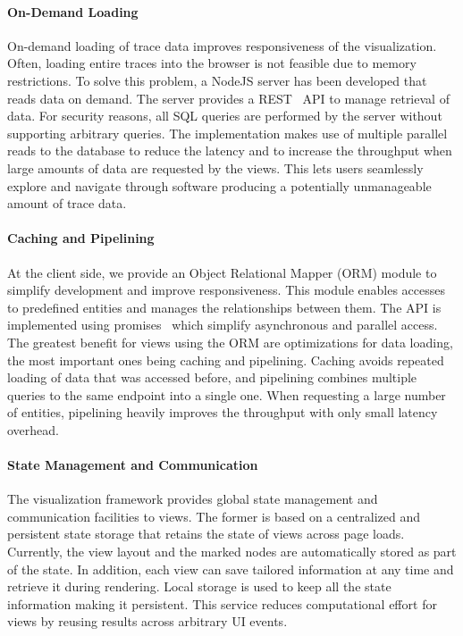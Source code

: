 \paragraph{On-Demand Loading}
On-demand loading of trace data improves responsiveness of the visualization.
Often, loading entire traces into the browser is not feasible due to memory
restrictions. To solve this problem, a NodeJS server has been developed that
reads data on demand. The server provides a REST~\cite{rest} API to manage
retrieval of data. For security reasons, all SQL queries are performed by the
server without supporting arbitrary queries. The implementation makes use of
multiple parallel reads to the database to reduce the latency and to increase
the throughput when large amounts of data are requested by the views. This lets
users seamlessly explore and navigate through software producing a potentially
unmanageable amount of trace data.

\paragraph{Caching and Pipelining}
At the client side, we provide an Object Relational Mapper (ORM) module to
simplify development and improve responsiveness. This module enables accesses
to predefined entities and manages the relationships between them. The API is
implemented using promises~\cite{promises} which simplify asynchronous and
parallel access. The greatest benefit for views using the ORM are optimizations
for data loading, the most important ones being caching and pipelining. Caching
avoids repeated loading of data that was accessed before, and pipelining
combines multiple queries to the same endpoint into a single one. When
requesting a large number of entities, pipelining heavily improves the
throughput with only small latency overhead.

\paragraph{State Management and Communication}
The visualization framework provides global state management and communication
facilities to views. The former is based on a centralized and persistent state
storage that retains the state of views across page loads. Currently,
the view layout and the marked nodes are automatically stored as part of the
state. In addition, each view can save tailored information at any time and
retrieve it during rendering. Local storage is used to keep all the state
information making it persistent. This service reduces computational effort for
views by reusing results across arbitrary UI events.

